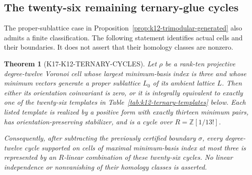 \documentclass[11pt,a4paper]{article}
\newtheorem{theorem}{Theorem}[section]
\theoremstyle{definition}
\begin{document}
\subsection{The twenty-six remaining ternary-glue cycles}
\label{subsec:k12-ternary-glue}

The proper-sublattice case in Proposition~\ref{prop:k12-trimodular-generated}
also admits a finite classification. The following statement identifies
actual cells and their boundaries. It does not assert that their homology
classes are nonzero.

\begin{theorem}[K17-K12-TERNARY-CYCLES]
\label{thm:k12-ternary-cycles}
Let $\rho$ be a rank-ten projective degree-twelve Voronoi cell whose
largest minimum-basis index is three and whose minimum vectors generate
a proper sublattice $L_0$ of its ambient lattice $L$.
Then either its orientation coinvariant is zero, or it is integrally
equivalent to exactly one of the twenty-six templates in
Table~\ref{tab:k12-ternary-templates} below. Each listed template is
realized by a positive form with exactly thirteen minimum pairs, has
orientation-preserving stabilizer, and is a cycle over
$R=\mathbb Z[1/13!]$.

Consequently, after subtracting the previously certified boundary
$\sigma$, every degree-twelve cycle supported on cells of maximal
minimum-basis index at most three is represented by an $R$-linear
combination of these twenty-six cycles. No linear independence or
nonvanishing of their homology classes is asserted.
\end{theorem}
\end{document}
